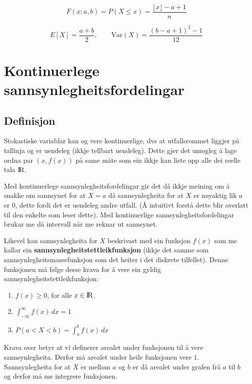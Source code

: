 \begin{equation}
    F(x; a, b) = P(X \leq x) = \frac{\lfloor x \rfloor - a + 1}{n}
\end{equation}

\begin{equation}
    E[X] = \frac{a + b}{2}, \qquad \text{Var}(X) = \frac{(b - a + 1)^2 - 1}{12}
\end{equation}

\section{Kontinuerlege sannsynlegheitsfordelingar}

\subsection{Definisjon}
Stokastiske variablar kan og vere kontinuerlige, dvs at utfallsrommet liggjer på tallinja og er uendeleg (ikkje tellbart uendeleg). Dette gjer det umogleg å lage ordna par $(x, f(x))$ på same måte som ein ikkje kan liste opp alle dei reelle tala ${\rm I\!R}$. 

Med kontinuerlege sannsynlegheitsfordelingar gir det då ikkje meining om å snakke om sannsynet for at $X = a$ då sannsynlegheita for at $X$ er nøyaktig lik $a$ er $0$, dette fordi det er uendeleg andre utfall. (Å intuitivt forstå dette blir overlatt til den enkelte som leser dette). Med kontinuerlige sannsynlegheitsfordelingar brukar me då intervall når me reknar ut sannsynet. 

Likevel kan sannsynlegheita for $X$ beskrivast med ein funksjon $f(x)$ som me kallar ein \textbf{sannsynlegheitstettleikfunksjon} (ikkje det samme som sannsynlegheitsmassefunksjon som det heiter i det diskrete tilfellet). Denne funksjonen må følge desse krava for å vere ein gyldig sannsynlegheitstettleikfunksjon:

\begin{enumerate}
    \item $f(x) \geq 0$, for alle $x \in {\rm I\!R}$.
    \item  $\int_{-\infty}^{\infty} f(x) \, dx = 1$
    \item $P(a < X < b) = \int_{a}^{b} f(x) \, dx$
\end{enumerate}

Krava over betyr at vi definerer arealet under funksjonen til å vere sannsynlegheita. Derfor må arealet under heile funksjonen vere $1$. Sannsynlegheita for at $X$ er mellom $a$ og $b$ er då arealet under grafen frå $a$ til $b$ og derfor må me integrere funksjonen.

